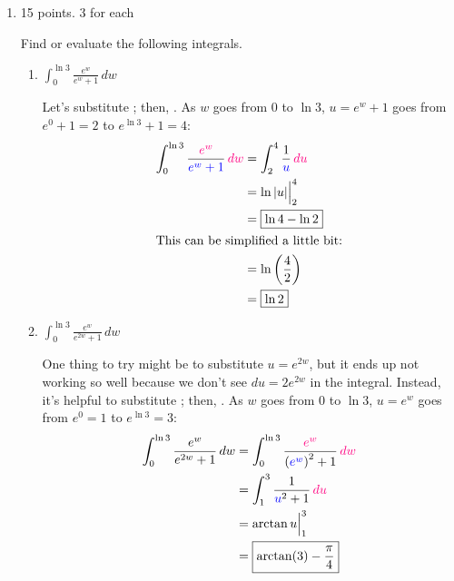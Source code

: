 \documentclass{article}
\begin{document}
\begin{enumerate}
\begin{enumerate}
    \end{enumerate}

\pspace{-12pt}

\item

\begin{grading}
15 points. 3 for each 
\end{grading}

 Find or evaluate the following integrals.

  \probonly{}
    \begin{enumerate}[topsep=0pt]
    \item
      \begin{problem}[\vfill]
        $\displaystyle\int_0^{\ln 3} \frac{e^w}{e^w+1}\,dw$
      \end{problem}

      \begin{solution}
        Let's substitute ; then, .  As $w$ goes from $0$ to $\ln 3$, $u = e^w + 1$ goes
        from $e^0 + 1 = 2$ to $e^{\ln 3} + 1 = 4$:
        \begin{align*}
          \int_0^{\ln 3} \frac{\subd{e^w}}{\sub{e^w+1}}\,\subd{dw} &=
          \int_2^4 \frac{1}{\sub{u}}\,\subd{du} \\
          &= \ln |u| \Big|_2^4 \\
          &= \boxed{\ln 4 - \ln 2} \\
          \shortintertext{This can be simplified a little bit:}
          &= \ln \left( \frac{4}{2} \right) \\
          &= \boxed{\ln 2}
        \end{align*}
      \end{solution}

    \item
      \begin{problem}[\vfill\newpage]
        $\displaystyle\int_0^{\ln 3} \frac{e^w}{e^{2w}+1}\,dw$
      \end{problem}

      \begin{solution}
        One thing to try might be to substitute $u = e^{2w}$, but it ends
        up not working so well because we don't see $du = 2 e^{2w}$ in the
        integral.  Instead, it's helpful to substitute ;
        then, .  As $w$ goes from $0$ to $\ln 3$, $u
        = e^w$ goes from $e^0 = 1$ to $e^{\ln 3} = 3$:
        \begin{align*}
          \int_0^{\ln 3} \frac{e^w}{e^{2w}+1}\,dw &= \int_0^{\ln 3}
          \frac{\subd{e^w}}{\left( \sub{e^w} \right)^2 + 1}\,\subd{dw} \\
          &= \int_1^3 \frac{1}{\sub{u}^2 + 1}\,\subd{du} \\
          &= \arctan u \Big|_1^3 \\
          &= \boxed{\arctan(3) - \frac{\pi}{4}}
        \end{align*}
      \end{solution}


\end{enumerate}
\end{enumerate}
\end{document}
